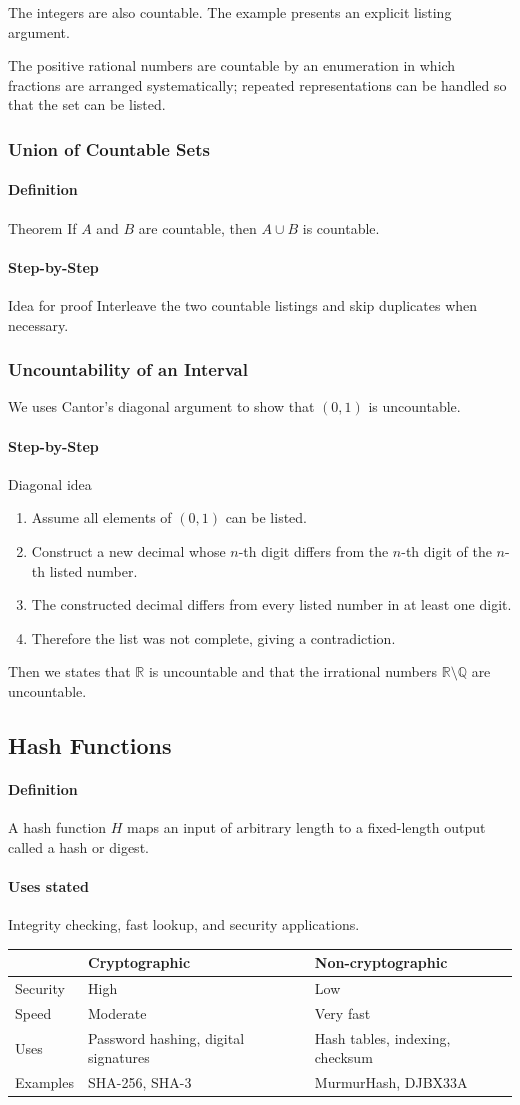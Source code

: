 \documentclass[12pt]{article}
\newcommand{\Definition}{\paragraph{Definition}}
\newcommand{\Step}{\paragraph{Step-by-Step}}
\begin{document}
The integers are also countable. The example presents an explicit listing argument.

The positive rational numbers are countable by an enumeration in which fractions are arranged systematically; repeated representations can be handled so that the set can be listed.

\subsubsection{Union of Countable Sets}
\Definition Theorem If $A$ and $B$ are countable, then $A\cup B$ is countable.

\Step{Idea for proof}
Interleave the two countable listings and skip duplicates when necessary.

\subsubsection{Uncountability of an Interval}
We uses Cantor's diagonal argument to show that $(0,1)$ is uncountable.

\Step{Diagonal idea}
\begin{enumerate}
    \item Assume all elements of $(0,1)$ can be listed.
    \item Construct a new decimal whose $n$-th digit differs from the $n$-th digit of the $n$-th listed number.
    \item The constructed decimal differs from every listed number in at least one digit.
    \item Therefore the list was not complete, giving a contradiction.
\end{enumerate}

Then we states that $\mathbb R$ is uncountable and that the irrational numbers $\mathbb R\setminus\mathbb Q$ are uncountable.

\subsection{Hash Functions}
\Definition A hash function $H$ maps an input of arbitrary length to a fixed-length output called a hash or digest.

\paragraph{Uses stated}
Integrity checking, fast lookup, and security applications.

\begin{table}[H]
\centering
\begin{tabularx}{\textwidth}{lXX}
\toprule
 & \textbf{Cryptographic} & \textbf{Non-cryptographic}\\
\midrule
Security & High & Low\\
Speed & Moderate & Very fast\\
Uses & Password hashing, digital signatures & Hash tables, indexing, checksum\\
Examples & SHA-256, SHA-3 & MurmurHash, DJBX33A\\
\bottomrule
\end{tabularx}
\end{table}
\end{document}
